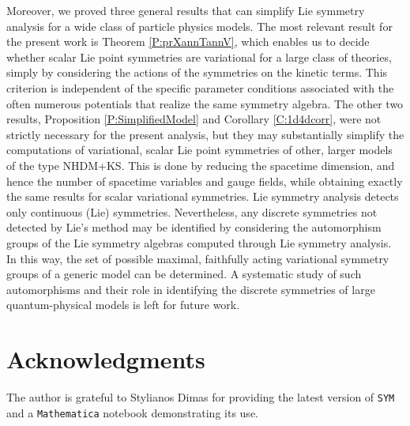 \documentclass[a4paper,hidelinks, 12pt]{article}
\numberwithin{equation}{section}
\theoremstyle{plain}
\begin{document}
Moreover, we proved three general results that can simplify 
  Lie symmetry analysis for a wide class of particle physics models. The most relevant result for the present work is Theorem \ref{P:prXannTannV}, which enables us to decide whether scalar Lie point symmetries are variational for a large class of theories, simply by considering the actions of the symmetries on the kinetic terms. This criterion is independent of the specific parameter conditions associated
with the often numerous potentials that realize the same symmetry algebra.
 The other two results, Proposition \ref{P:SimplifiedModel} and Corollary \ref{C:1d4dcorr}, were not strictly necessary for the present analysis, but they may substantially simplify the computations of variational, scalar Lie point symmetries of other, larger models of the type NHDM+KS. This is done by reducing the spacetime dimension, and hence the number of spacetime variables and gauge fields, while obtaining exactly the same results for scalar variational symmetries. Lie symmetry analysis detects only continuous (Lie) symmetries. Nevertheless, any discrete symmetries not detected by Lie's method may be identified by considering the automorphism groups of the Lie symmetry algebras computed through Lie symmetry analysis. In this way, the set of possible maximal, faithfully acting variational symmetry groups of a generic model can be determined. A systematic study of such automorphisms and their role in identifying the discrete symmetries of large quantum-physical models is left for future work.
	

\section*{Acknowledgments}
The author is grateful to Stylianos Dimas for providing the latest version of \texttt{SYM} \cite{dimas2005sym} and a \texttt{Mathematica} notebook demonstrating its use.

\appendix
\end{document}
